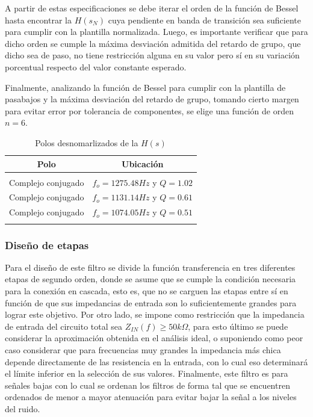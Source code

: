 A partir de estas especificaciones se debe iterar el orden de la funci\'on de Bessel hasta encontrar la $H(s_N)$ cuya pendiente en banda de transici\'on sea suficiente para cumplir con la plantilla
normalizada. Luego, es importante verificar que para dicho orden se cumple la m\'axima desviaci\'on admitida del retardo de grupo, que dicho sea de paso, no tiene restricci\'on alguna en su valor pero s\'i
en su variaci\'on porcentual respecto del valor constante esperado.


Finalmente, analizando la funci\'on de Bessel para cumplir con la plantilla de pasabajos y la m\'axima desviaci\'on del retardo de grupo, tomando cierto margen para evitar error por tolerancia de componentes,
se elige una funci\'on de orden $n = 6$.

\begin{table}[H]
    \centering
    \begin{tabular}{c | c}
        Polo & Ubicaci\'on \\
        \hline \\
        Complejo conjugado & $f_o = 1275.48Hz$ y $Q = 1.02$ \\
        Complejo conjugado & $f_o = 1131.14Hz$ y $Q = 0.61$\\
        Complejo conjugado & $f_o = 1074.05Hz$ y $Q = 0.51$\\
        \\ \hline
    \end{tabular}
    \caption{Polos desnomarlizados de la $H(s)$}
\end{table}

\subsubsection{Dise\~no de etapas}
Para el dise\~no de este filtro se divide la funci\'on transferencia en tres diferentes etapas de segundo orden, donde se asume que se cumple la condici\'on necesaria para la conexi\'on en cascada,
esto es, que no se carguen las etapas entre s\'i en funci\'on de que sus impedancias de entrada son lo suficientemente grandes para lograr este objetivo. Por otro lado, se impone como restricci\'on que la impedancia de entrada
del circuito total sea $Z_{IN}(f) \geq 50k \Omega$, para esto \'ultimo se puede considerar la aproximaci\'on obtenida en el an\'alisis ideal, o suponiendo como peor caso considerar que para frecuencias muy grandes la impedancia m\'as chica
depende directamente de las resistencia en la entrada, con lo cual eso determinar\'a el l\'imite inferior en la selecci\'on de sus valores. Finalmente, este filtro es para se\~nales bajas con lo cual se ordenan los filtros de forma tal que se encuentren ordenados
de menor a mayor atenuaci\'on para evitar bajar la se\~nal a los niveles del ruido.

